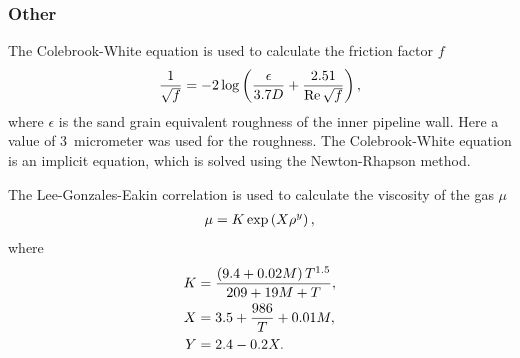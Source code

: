 \subsubsection{Other}
The Colebrook-White equation \cite{Colebrook1939Turbulent} is used to calculate the friction factor $f$
\begin{align}
    \frac{1}{\sqrt{f}} = -2\log \del{\frac{\epsilon}{3.7 D} + \frac{2.51}{\Reyn \sqrt{f}}}
    \label{eq:colebrookWhite}
,
\end{align}
where $\epsilon$ is the sand grain equivalent roughness of the inner pipeline wall. Here a value of 3~micrometer was used for the roughness. The Colebrook-White equation is an implicit equation, which is solved using the Newton-Rhapson method. 

The Lee-Gonzales-Eakin correlation \cite{Lee1966Viscosity} is used to calculate the viscosity of the gas $\mu$
\begin{align}
    \mu = K\exp\del{X\rho^y},
\label{eq:LGE}
\end{align}
where
\begin{align}
    K &= \frac{\del{9.4+0.02M} T^{1.5}}{209 + 19 M + T}, \\
    X &= 3.5 + \frac{986}{T} + 0.01 M, \\
    Y &= 2.4 - 0.2X.
\end{align}